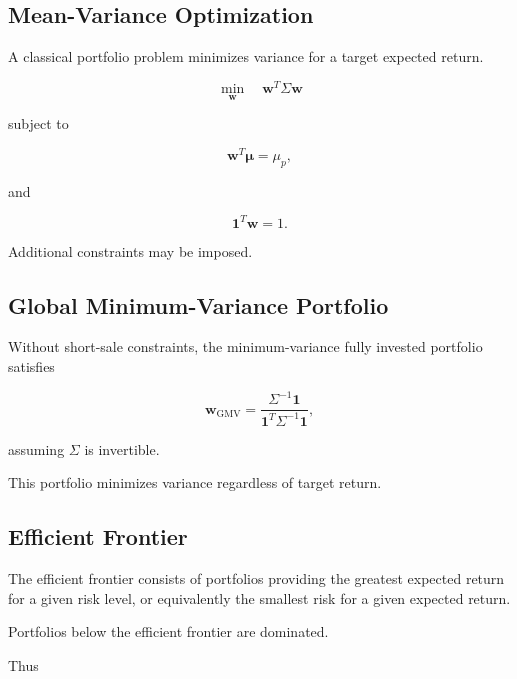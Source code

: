 \subsection{Mean-Variance Optimization}
\label{subsec:mean-variance-optimization}

A classical portfolio problem minimizes variance for a target expected
return.

\[
\boxed{
\min_{\mathbf{w}}
\quad
\mathbf{w}^T\Sigma\mathbf{w}
}
\]

subject to

\[
\boxed{
\mathbf{w}^T\boldsymbol{\mu}
=
\mu_p,
}
\]

and

\[
\boxed{
\mathbf{1}^T\mathbf{w}
=
1.
}
\]

Additional constraints may be imposed.

\subsection{Global Minimum-Variance Portfolio}
\label{subsec:global-minimum-variance}

Without short-sale constraints, the minimum-variance fully invested portfolio
satisfies

\[
\boxed{
\mathbf{w}_{\mathrm{GMV}}
=
\frac{
\Sigma^{-1}\mathbf{1}
}{
\mathbf{1}^T
\Sigma^{-1}
\mathbf{1}
},
}
\]

assuming \(\Sigma\) is invertible.

This portfolio minimizes variance regardless of target return.

\subsection{Efficient Frontier}
\label{subsec:efficient-frontier}

The efficient frontier consists of portfolios providing the greatest
expected return for a given risk level, or equivalently the smallest risk
for a given expected return.

Portfolios below the efficient frontier are dominated.

Thus

